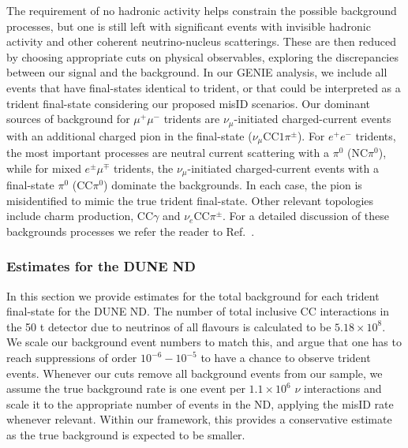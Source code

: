 The requirement of no hadronic activity helps constrain the possible background processes, but one is still left with significant events with invisible hadronic activity and other coherent neutrino-nucleus scatterings. These are then reduced by choosing appropriate cuts on physical observables, exploring the discrepancies between our signal and the background. In our GENIE analysis, we include all events that have final-states identical to trident, or that could be interpreted as a trident final-state considering our proposed misID scenarios. Our dominant sources of background for $\mu^+ \mu^-$ tridents are $\nu_\mu$-initiated charged-current events with an additional charged pion in the final-state ($\nu_\mu$CC$1\pi^\pm$). For $e^+e^-$ tridents, the most important processes are neutral current scattering with a $\pi^0$ (NC$\pi^0$), while for mixed $e^\pm \mu^\mp$ tridents, the $\nu_\mu$-initiated charged-current events with a final-state $\pi^0$ (CC$\pi^0$) dominate the backgrounds. In each case, the pion is misidentified to mimic the true trident final-state. Other relevant topologies include charm production, CC$\gamma$ and $\nu_e$CC$\pi^\pm$. For a detailed discussion of these backgrounds processes we refer the reader to Ref.~\cite{Ballett:2018uuc}.

\subsubsection{\label{sec:DUNE_bg_rates}Estimates for the DUNE ND}

In this section we provide estimates for the total background for each trident final-state for the DUNE ND. The number of total inclusive CC interactions in the 50 t detector due to neutrinos of all flavours is calculated to be $5.18 \times 10^8$. We scale our background event numbers to match this, and argue that one has to reach suppressions of order $10^{-6} - 10^{-5}$ to have a chance to observe trident events. Whenever our cuts remove all background events from our sample, we assume the true background rate is one event per $1.1\times10^6$ $\nu$ interactions and scale it to the appropriate number of events in the ND, applying the misID rate whenever relevant. Within our framework, this provides a conservative estimate as the true background is expected to be smaller.

